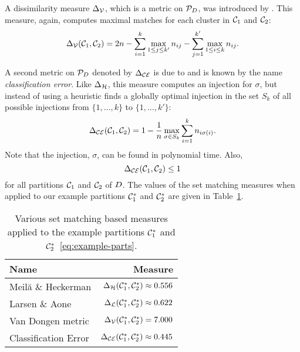A dissimilarity measure $\Delta_{\mathcal{V}}$, which is a metric on
$\mathcal{P}_{D}$, was introduced by \citet{van-dongen-2000}.  This measure,
again, computes maximal matches for each cluster in $\mathcal{C}_1$ and $\mathcal{C}_2$:
\begin{equation*}
  \Delta_{\mathcal{V}}(\mathcal{C}_1,\mathcal{C}_2) = 2n - \sum_{i=1}^{k} \max_{1 \leq j \leq k'} n_{ij} -
                         \sum_{j=1}^{k'} \max_{1 \leq i \leq k} n_{ij}.
\end{equation*}

A second metric on $\mathcal{P}_{D}$ denoted by $\Delta_{\mathcal{CE}}$ is due to
\citet{meila-2005} and is known by the name \textit{classification error}.
Like $\Delta_{\mathcal{H}}$, this measure computes an injection for $\sigma$, but
instead of using a heuristic finds a globally optimal injection in the set
$S_k$ of all possible injections from $\{1,\dotsc,k\}$ to $\{1,\dotsc,k'\}$:
\begin{equation*}
  \Delta_{\mathcal{CE}}(\mathcal{C}_1,\mathcal{C}_2) = 1 - \frac{1}{n} \max_{\sigma \in S_k}
                                     \sum_{i=1}^{k} n_{i \sigma(i)}.
\end{equation*}
Note that the injection, $\sigma$, can be found in polynomial time.  Also,
\[\Delta_{\mathcal{CE}}(\mathcal{C}_1,\mathcal{C}_2) \leq 1\] for all partitions $\mathcal{C}_1$ and $\mathcal{C}_2$ of
$D$.  The values of the set matching measures when applied to our example
partitions $\mathcal{C}^*_1$ and $\mathcal{C}^*_2$ are given in
Table~\ref{tab:set-matching-comparison}.

\begin{table}
  \centering
  \begin{tabular}{lr}
    \toprule
    Name & Measure \\
    \midrule
    Meilă \& Heckerman   & $\Delta_{\mathcal{H}}(\mathcal{C}^*_1,\mathcal{C}^*_2) \approx 0.556$ \\
    Larsen \& Aone       & $\Delta_{\mathcal{L}}(\mathcal{C}^*_1,\mathcal{C}^*_2) \approx 0.622$ \\
    Van Dongen metric    & $\Delta_{\mathcal{V}}(\mathcal{C}^*_1,\mathcal{C}^*_2) = 7.000$ \\
    Classification Error & $\Delta_{\mathcal{CE}}(\mathcal{C}^*_1,\mathcal{C}^*_2) \approx 0.445$ \\
    
    \bottomrule
  \end{tabular}
  \caption{Various set matching based measures applied to the example
    partitions $\mathcal{C}^*_1$ and $\mathcal{C}^*_2$~\eqref{eq:example-parts}.}
  \label{tab:set-matching-comparison}
\end{table}

